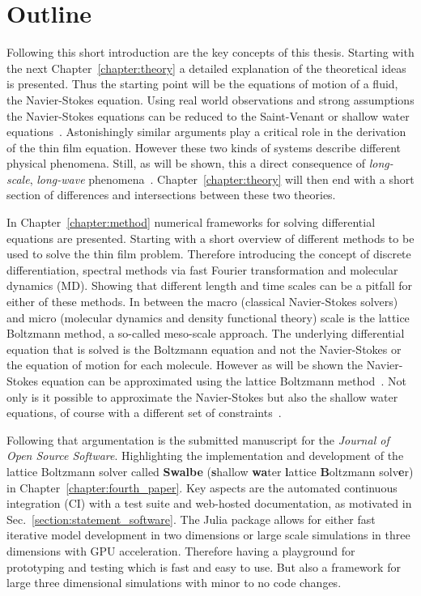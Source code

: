 \section{Outline}
\label{section:outline}
Following this short introduction are the key concepts of this thesis.
Starting with the next Chapter~\ref{chapter:theory} a detailed explanation of the theoretical ideas is presented.
Thus the starting point will be the equations of motion of a fluid, the Navier-Stokes equation.
Using real world observations and strong assumptions the Navier-Stokes equations can be reduced to the Saint-Venant or shallow water equations~\cite{saint1871theorie, williamson1992standard}.
Astonishingly similar arguments play a critical role in the derivation of the thin film equation.
However these two kinds of systems describe different physical phenomena.
Still, as will be shown, this a direct consequence of \textit{long-scale}, \textit{long-wave}  phenomena~\cite{RevModPhys.69.931}.
Chapter~\ref{chapter:theory} will then end with a short section of differences and intersections between these two theories.

In Chapter~\ref{chapter:method} numerical frameworks for solving differential equations are presented.
Starting with a short overview of different methods to be used to solve the thin film problem.
Therefore introducing the concept of discrete differentiation, spectral methods via fast Fourier transformation and molecular dynamics (MD).
Showing that different length and time scales can be a pitfall for either of these methods.
In between the macro (classical Navier-Stokes solvers) and micro (molecular dynamics and density functional theory) scale is the lattice Boltzmann method, a so-called meso-scale approach.
The underlying differential equation that is solved is the Boltzmann equation and not the Navier-Stokes or the equation of motion for each molecule.
However as will be shown the Navier-Stokes equation can be approximated using the lattice Boltzmann method~\cite{Enskog, Chapman, doi:10.1146/annurev.fluid.30.1.329, krueger2017}.  
Not only is it possible to approximate the Navier-Stokes but also the shallow water equations, of course with a different set of constraints~\cite{Salmon:1999:0022-2402:503, zhou2004lattice, van2010study, PhysRevE.65.036309}.

Following that argumentation is the submitted manuscript for the \textit{Journal of Open Source Software}. 
Highlighting the implementation and development of the lattice Boltzmann solver called \textbf{Swalbe} (\textbf{s}hallow \textbf{wa}ter \textbf{l}attice \textbf{B}oltzmann solv\textbf{e}r) in Chapter~\ref{chapter:fourth_paper}.
Key aspects are the automated continuous integration (CI) with a test suite and web-hosted documentation, as motivated in Sec.~\ref{section:statement_software}.
The Julia package allows for either fast iterative model development in two dimensions or large scale simulations in three dimensions with GPU acceleration.
Therefore having a playground for prototyping and testing which is fast and easy to use.
But also a framework for large three dimensional simulations with minor to no code changes.

